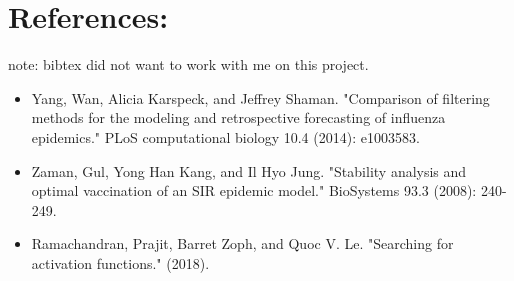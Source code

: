 \pagebreak
\section{References:}
note: bibtex did not want to work with me on this project.
\begin{itemize}
\item Yang, Wan, Alicia Karspeck, and Jeffrey Shaman. "Comparison of filtering methods for the modeling and retrospective forecasting of influenza epidemics." PLoS computational biology 10.4 (2014): e1003583.

\item Zaman, Gul, Yong Han Kang, and Il Hyo Jung. "Stability analysis and optimal vaccination of an SIR epidemic model." BioSystems 93.3 (2008): 240-249.

\item Ramachandran, Prajit, Barret Zoph, and Quoc V. Le. "Searching for activation functions." (2018).\label{ref:3}

\end{itemize}



%
















